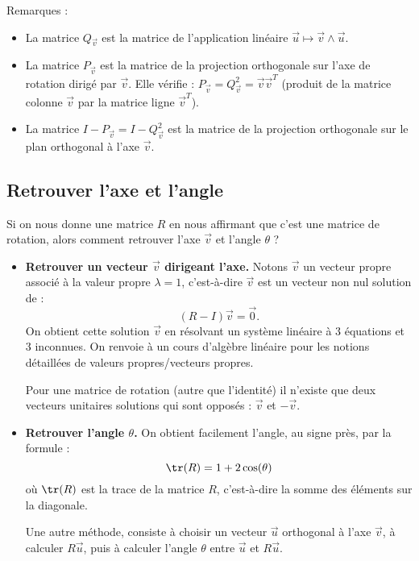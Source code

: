 \documentclass[11pt,class=report,crop=false]{standalone}
\begin{document}

Remarques :
\begin{itemize}
  \item La matrice $Q_{\vec v}$ est la matrice de l'application linéaire $\vec u \mapsto {\vec v} \wedge {\vec u}$.

  \item La matrice $P_{\vec v}$ est la matrice de la projection orthogonale sur l'axe de rotation dirigé par $\vec v$. Elle vérifie : $P_{\vec v} = Q_{\vec v}^2 = {\vec v}  {\vec v}^T$ (produit de la matrice  colonne $\vec v$ par la matrice ligne ${\vec v}^T$).

  \item La matrice $I-P_{\vec v} = I-Q_{\vec v}^2$ est la matrice de la projection orthogonale sur le plan orthogonal à l'axe $\vec v$.
\end{itemize}


\subsection{Retrouver l'axe et l'angle}

Si on nous donne une matrice $R$ en nous affirmant que c'est une matrice de rotation, alors comment retrouver l'axe $\vec v$ et l'angle $\theta$ ?

\begin{itemize}
  \item \textbf{Retrouver un vecteur $\vec v$ dirigeant l'axe.}
  Notons $\vec v$ un vecteur propre associé à la valeur propre $\lambda = 1$, c'est-à-dire $\vec v$ est un vecteur non nul solution de :
  $$ (R-I) \vec v = \vec 0.$$
  On obtient cette solution $\vec v$ en résolvant un système linéaire à $3$ équations et $3$ inconnues. On renvoie à un cours d'algèbre linéaire pour les notions détaillées de valeurs propres/vecteurs propres.

  Pour une matrice de rotation (autre que l'identité) il n'existe que deux vecteurs unitaires solutions qui sont opposés : $\vec v$ et $-\vec v$.

  \item \textbf{Retrouver l'angle $\theta$.}
  On obtient facilement l'angle, au signe près, par la formule :
  $$\tr(R) = 1 + 2\cos(\theta)$$
  où $\tr(R)$ est la trace de la matrice $R$, c'est-à-dire la somme des éléments sur la diagonale.

  Une autre méthode, consiste à choisir un vecteur $\vec u$ orthogonal à l'axe $\vec v$, à calculer $R\vec u$, puis à calculer l'angle $\theta$ entre $\vec u$ et  
  $R\vec u$.
\end{itemize}
\end{document}
